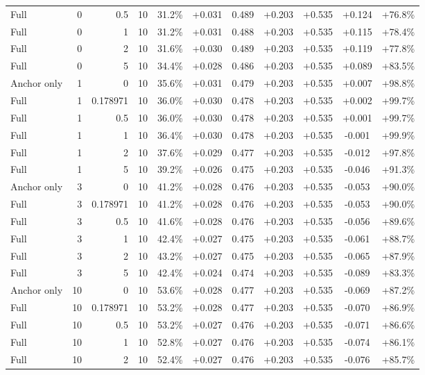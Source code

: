 \begin{table}[htbp]
\begin{tabular}{lrrrccccccc}
Full & 0 & 0.5 & 10 & 31.2\% & +0.031 & 0.489 & +0.203 & +0.535 & +0.124 & +76.8\% \\
Full & 0 & 1 & 10 & 31.2\% & +0.031 & 0.488 & +0.203 & +0.535 & +0.115 & +78.4\% \\
Full & 0 & 2 & 10 & 31.6\% & +0.030 & 0.489 & +0.203 & +0.535 & +0.119 & +77.8\% \\
Full & 0 & 5 & 10 & 34.4\% & +0.028 & 0.486 & +0.203 & +0.535 & +0.089 & +83.5\% \\
Anchor only & 1 & 0 & 10 & 35.6\% & +0.031 & 0.479 & +0.203 & +0.535 & +0.007 & +98.8\% \\
Full & 1 & 0.178971 & 10 & 36.0\% & +0.030 & 0.478 & +0.203 & +0.535 & +0.002 & +99.7\% \\
Full & 1 & 0.5 & 10 & 36.0\% & +0.030 & 0.478 & +0.203 & +0.535 & +0.001 & +99.7\% \\
Full & 1 & 1 & 10 & 36.4\% & +0.030 & 0.478 & +0.203 & +0.535 & -0.001 & +99.9\% \\
Full & 1 & 2 & 10 & 37.6\% & +0.029 & 0.477 & +0.203 & +0.535 & -0.012 & +97.8\% \\
Full & 1 & 5 & 10 & 39.2\% & +0.026 & 0.475 & +0.203 & +0.535 & -0.046 & +91.3\% \\
Anchor only & 3 & 0 & 10 & 41.2\% & +0.028 & 0.476 & +0.203 & +0.535 & -0.053 & +90.0\% \\
Full & 3 & 0.178971 & 10 & 41.2\% & +0.028 & 0.476 & +0.203 & +0.535 & -0.053 & +90.0\% \\
Full & 3 & 0.5 & 10 & 41.6\% & +0.028 & 0.476 & +0.203 & +0.535 & -0.056 & +89.6\% \\
Full & 3 & 1 & 10 & 42.4\% & +0.027 & 0.475 & +0.203 & +0.535 & -0.061 & +88.7\% \\
Full & 3 & 2 & 10 & 43.2\% & +0.027 & 0.475 & +0.203 & +0.535 & -0.065 & +87.9\% \\
Full & 3 & 5 & 10 & 42.4\% & +0.024 & 0.474 & +0.203 & +0.535 & -0.089 & +83.3\% \\
Anchor only & 10 & 0 & 10 & 53.6\% & +0.028 & 0.477 & +0.203 & +0.535 & -0.069 & +87.2\% \\
Full & 10 & 0.178971 & 10 & 53.2\% & +0.028 & 0.477 & +0.203 & +0.535 & -0.070 & +86.9\% \\
Full & 10 & 0.5 & 10 & 53.2\% & +0.027 & 0.476 & +0.203 & +0.535 & -0.071 & +86.6\% \\
Full & 10 & 1 & 10 & 52.8\% & +0.027 & 0.476 & +0.203 & +0.535 & -0.074 & +86.1\% \\
Full & 10 & 2 & 10 & 52.4\% & +0.027 & 0.476 & +0.203 & +0.535 & -0.076 & +85.7\% \\

\end{tabular}
\end{table}
